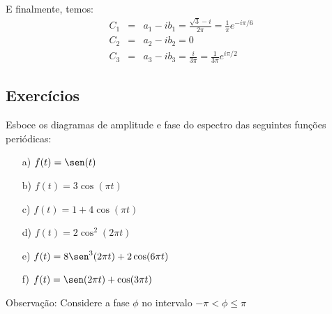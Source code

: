 \begin{resol}
  E finalmente, temos:
  \begin{eqnarray*}
   C_1&=&a_1-ib_1=\frac{\sqrt{3}-i}{2\pi}=\frac{1}{\pi}e^{-i\pi/6}\\
    C_2&=&a_2-ib_2=0\\
    C_3&=&a_3-ib_3=\frac{i}{3\pi}=\frac{1}{3\pi}e^{i\pi/2} 
  \end{eqnarray*}
  
  
  
\end{resol}



\subsection*{Exercícios}
\begin{exer}
Esboce os diagramas de amplitude e fase do espectro das seguintes funções periódicas:
\begin{itemize}
\item[a)] $f(t)=\sen(t)$\
\item[b)] $f(t)=3\cos(\pi t)$
\item[c)] $f(t)=1+4\cos(\pi t)$
\item[d)] $f(t)=2\cos^2(2\pi t)$
\item[e)] $f(t)=8\sen^3(2\pi t)+2\cos(6\pi t)$
\item[f)] $f(t)=\sen(2\pi t)+\cos(3\pi t)$
\end{itemize}
Observação: Considere a fase $\phi$ no intervalo $-\pi< \phi\leq \pi$
\end{exer}
